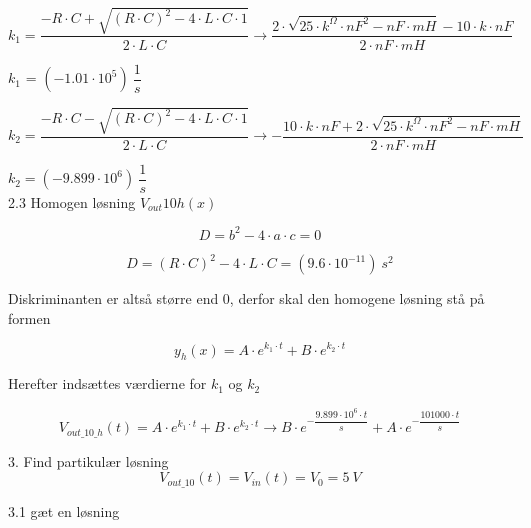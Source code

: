 \begin{equation}
	k_{1} = \dfrac{ -R\cdot C+ \sqrt{ \left(R\cdot C\right) ^{2}-4\cdot L\cdot C\cdot 1} }{2\cdot L\cdot C} \rightarrow 
	\dfrac{2\cdot  \sqrt{25\cdot k^{\Omega}\cdot nF^{2}-nF\cdot mH} -10\cdot k\cdot nF}{2\cdot nF\cdot mH}
\end{equation}

$k_1$ = $\left( -1.01\cdot 10^{5}\right) \ \dfrac{1}{s}$

\begin{equation}
	k_{2} = \dfrac{ -R\cdot C- \sqrt{ \left(R\cdot C\right) ^{2}-4\cdot L\cdot C\cdot 1} }{2\cdot L\cdot C} \rightarrow 
	 -\dfrac{10\cdot k\cdot nF+2\cdot  \sqrt{25\cdot k^{\Omega}\cdot nF^{2}-nF\cdot mH} }{2\cdot nF\cdot mH}
\end{equation}

$k_{2} =  \left( -9.899\cdot 10^{6}\right) \ \dfrac{1}{s}$ \\

2.3 Homogen løsning $V_{out}{10}h(x)$

\begin{equation}
D = b^2 - 4\cdot a\cdot c = 0
\end{equation}

\begin{equation}
	D =  \left(R\cdot C\right) ^{2}-4\cdot L\cdot C =  \left(9.6\cdot 10^{ -11}\right) \ s^{2}
\end{equation}

Diskriminanten er altså større end 0, derfor skal den homogene løsning stå på formen

\begin{equation}
	y_h  \left(x\right)  = A\cdot e^{k_{1}\cdot t}+B\cdot e^{k_{2}\cdot t}
	\label{homogen_10k}
\end{equation}

Herefter indsættes værdierne for $k_1$ og $k_2$

\begin{equation}
	V_{out\_10\_h} \left(t\right)  = A\cdot e^{k_{1}\cdot t}+B\cdot e^{k_{2}\cdot t} \xrightarrow{} B\cdot e^{ -\dfrac{9.899\cdot 10^{6}\cdot t}{s}}+A\cdot e^{ -\dfrac{101000\cdot t}{s}}
	\label{homogen10K}
\end{equation}

3. Find partikulær løsning
\begin{equation}
	V_{out\_10}  \left(t\right)  = V_{in}  \left(t\right)  = V_{0} = 5\ V
\end{equation}

3.1 gæt en løsning \\

